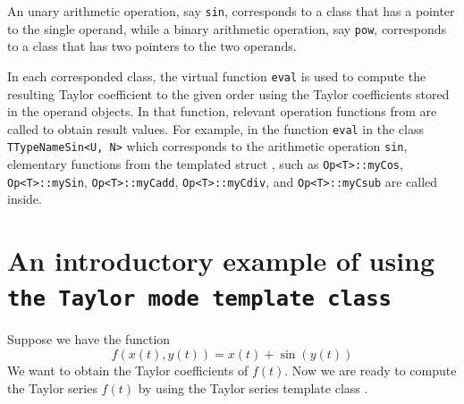 An unary arithmetic operation, say {\tt sin}, corresponds to a class that has a pointer to the single operand, while a binary arithmetic operation, say {\tt pow}, corresponds to a class that has two pointers to the two operands. 

In each corresponded class, the virtual function {\tt eval} is used to compute the resulting Taylor coefficient to the given order using the Taylor coefficients stored in the operand objects. In that function, relevant operation functions from \Opn are called to obtain result values. For example, in the function {\tt eval} in the class {\tt TTypeNameSin<U, N>} which corresponds to the arithmetic operation {\tt sin}, elementary functions from the templated struct \Op, such as {\tt Op<T>::myCos}, {\tt Op<T>::mySin}, {\tt Op<T>::myCadd}, {\tt Op<T>::myCdiv}, and {\tt Op<T>::myCsub} are called inside.
\section{An introductory example of using \textbf\texttt{the Taylor mode template class}}
Suppose we have the function
\begin{equation}
f(x(t),y(t))=x(t)+\sin(y(t))
\label{eq:2}
\end{equation}
We want to obtain the Taylor coefficients of $f(t)$. Now we are ready to compute the Taylor series $f(t)$ by using the Taylor series template class \Tn.

